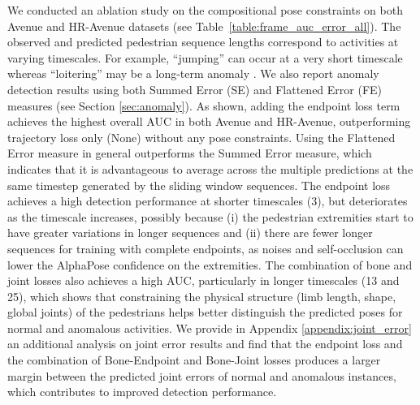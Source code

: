 \documentclass[nohyperref]{article}
\theoremstyle{plain}
\theoremstyle{definition}
\theoremstyle{remark}
\begin{document}
We conducted an ablation study on the compositional pose constraints  on both Avenue and HR-Avenue datasets (see Table~\ref{table:frame_auc_error_all}). The observed and predicted pedestrian sequence lengths  correspond to activities  at varying timescales. For example, ``jumping'' can occur at a very short timescale whereas ``loitering'' may be
a long-term anomaly \cite{rodrigues2020multi}. We also report anomaly detection results using both Summed Error (SE) and Flattened Error (FE) measures (see Section \ref{sec:anomaly}). As shown, adding the endpoint loss term achieves the highest overall AUC in both Avenue and HR-Avenue, outperforming trajectory loss only (None) without any pose constraints. Using the Flattened Error measure in general outperforms the Summed Error measure, which indicates that it is advantageous to average across the multiple predictions at the same timestep generated by the sliding window sequences. The endpoint loss achieves a high detection performance at shorter timescales (3), but deteriorates as the timescale increases, possibly because (i) the pedestrian extremities start to have greater variations in longer sequences and (ii) there are fewer longer sequences for training with complete endpoints, as noises and self-occlusion can lower the AlphaPose confidence on the extremities. The combination of bone and joint losses also achieves a high AUC, particularly in longer timescales (13 and 25), which shows that constraining the physical structure (limb length, shape, global joints) of the pedestrians helps better distinguish the predicted poses for normal and anomalous activities. We provide in Appendix \ref{appendix:joint_error}
 an additional analysis on joint error results and find that the endpoint loss and the combination of Bone-Endpoint and Bone-Joint losses produces a larger margin between the predicted joint errors of normal and anomalous instances, which  contributes to improved detection performance. 



\vspace{-4mm}
\end{document}
